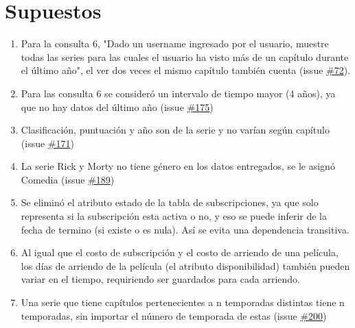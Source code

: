 \documentclass{article}
\begin{document}
\section{Supuestos}
\begin{enumerate}
    \item Para la consulta 6, "Dado un username ingresado por el usuario, muestre todas las series para las cuales el usuario ha visto más de un capítulo durante el último año", el ver dos veces el mismo capítulo también cuenta (issue \href{https://github.com/IIC2413/Syllabus-2023-2/issues/172}{\#72}).
    \item Para las consulta 6 se consideró un intervalo de tiempo mayor (4 años), ya que no hay datos del último año (issue \href{https://github.com/IIC2413/Syllabus-2023-2/issues/175}{\#175})
    \item Clasificación, puntuación y año son de la serie y no varían según capítulo (issue \href{https://github.com/IIC2413/Syllabus-2023-2/issues/171}{\#171})
    \item La serie Rick  y Morty no tiene género en los datos entregados, se le asignó Comedia (issue \href{https://github.com/IIC2413/Syllabus-2023-2/issues/189}{\#189})
    \item Se eliminó el atributo estado de la tabla de subscripciones, ya que solo representa si la subscripción esta activa o no, y eso se puede inferir de la fecha de termino (si existe o es nula). Así se evita una dependencia transitiva.
    \item Al igual que el costo de subscripción y el costo de arriendo de una película, los días de arriendo de la película (el atributo disponibilidad) también pueden variar en el tiempo, requiriendo ser guardados para cada arriendo.
    \item Una serie que tiene capítulos pertenecientes a n temporadas distintas tiene n temporadas, sin importar el número de temporada de estas (issue \href{https://github.com/IIC2413/Syllabus-2023-2/issues/200}{\#200})
\end{enumerate}
\end{document}
